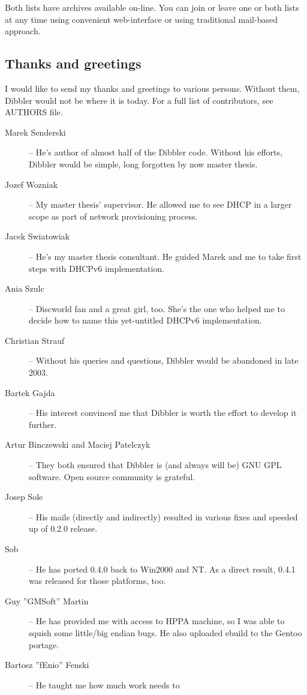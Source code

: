 Both lists have archives available on-line. You can join or leave one or both lists
at any time using convenient web-interface or using traditional mail-based approach.

\subsection{Thanks and greetings}

I would like to send my thanks and greetings to various persons.
Without them, Dibbler would not be where it is today. For a full list
of contributors, see AUTHORS file.

\begin{description}
\item[Marek Senderski] -- He's author of almost half of the Dibbler
  code. Without his efforts, Dibbler would be simple, long forgotten
  by now master thesis.
\item[Jozef Wozniak] -- My master thesis' supervisor. He allowed me to
  see DHCP in a larger scope as part of network provisioning process.
\item[Jacek Swiatowiak] -- He's my master thesis consultant. He guided
  Marek and me to take first steps with DHCPv6 implementation.
\item[Ania Szulc] -- Discworld fan and a great girl, too. She's the one
  who helped me to decide how to name this yet-untitled DHCPv6 implementation.
\item[Christian Strauf] -- Without his queries and questions, Dibbler
  would be abandoned in late 2003.
\item[Bartek Gajda] -- His interest convinced me that Dibbler is worth
  the effort to develop it further.
\item[Artur Binczewski and Maciej Patelczyk] -- They both ensured that
  Dibbler is (and always will be) GNU GPL software. Open source
  community is grateful.
\item[Josep Sole] -- His mails (directly and indirectly) resulted in
  various fixes and speeded up of 0.2.0 release.
\item[Sob] -- He has ported 0.4.0 back to Win2000 and NT. As a direct
  result, 0.4.1 was released for those platforms, too.
\item[Guy ''GMSoft'' Martin] -- He has provided me with access to HPPA
  machine, so I was able to squish some little/big endian bugs. He
  also uploaded ebuild to the Gentoo portage.
\item[Bartosz ''fEnio'' Fenski] -- He taught me how much work needs to

\end{description}
